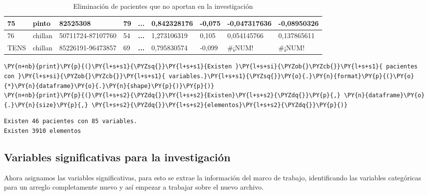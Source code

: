 \begin{table}[H]
{\begin{tabular}{|l|l|l|l|c|l|l|l|l|}
75 & pinto & 82525308 & 79 & \textbf{...} & 0,842328176 & -0,075 & -0,047317636 & -0,08950326 \\ \hline
76 & chillan & 50711724-87107760 & 54 & \textbf{...} & 1,273106319 & 0,105 & 0,054145766 & 0,137865611 \\ \hline
TENS & chillan & 85226191-96473857 & 69 & \textbf{...} & 0,795830574 & -0,099 & \#¡NUM! & \#¡NUM! \\ \hline
\end{tabular}%
}
\caption{Eliminación de pacientes que no aportan en la investigación}
\label{tab:bdd}
\end{table}
        
    \begin{tcolorbox}[breakable, size=fbox, boxrule=1pt, pad at break*=1mm,colback=cellbackground, colframe=cellborder]
\begin{Verbatim}[commandchars=\\\{\}]
\PY{n+nb}{print}\PY{p}{(}\PY{l+s+s1}{\PYZsq{}}\PY{l+s+s1}{Existen }\PY{l+s+si}{\PYZob{}\PYZcb{}}\PY{l+s+s1}{ pacientes con }\PY{l+s+si}{\PYZob{}\PYZcb{}}\PY{l+s+s1}{ variables.}\PY{l+s+s1}{\PYZsq{}}\PY{o}{.}\PY{n}{format}\PY{p}{(}\PY{o}{*}\PY{n}{dataframe}\PY{o}{.}\PY{n}{shape}\PY{p}{)}\PY{p}{)}
\PY{n+nb}{print}\PY{p}{(}\PY{l+s+s2}{\PYZdq{}}\PY{l+s+s2}{Existen}\PY{l+s+s2}{\PYZdq{}}\PY{p}{,} \PY{n}{dataframe}\PY{o}{.}\PY{n}{size}\PY{p}{,} \PY{l+s+s2}{\PYZdq{}}\PY{l+s+s2}{elementos}\PY{l+s+s2}{\PYZdq{}}\PY{p}{)}
\end{Verbatim}
\end{tcolorbox}

    \begin{Verbatim}[commandchars=\\\{\}]
Existen 46 pacientes con 85 variables.
Existen 3910 elementos
    \end{Verbatim}

    \hypertarget{variables-significativas-para-la-investigaciuxf3n}{%
\subsection{Variables significativas para la
investigación}\label{variables-significativas-para-la-investigaciuxf3n}}

Ahora asignamos las variables significativas, para esto se extrae la información del marco de trabajo, identificando las variables categóricas para un arreglo completamente nuevo y así empezar a trabajar sobre el nuevo archivo.

